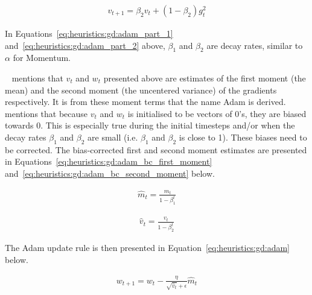 \begin{equation}
      \label{eq:heuristics:gd:adam_part_2}
      \begin{split}
            v_{t+1} = \beta_{2}v_{t} + (1 - \beta_{2})g^{2}_{t}
      \end{split}
\end{equation}

In Equations~\ref{eq:heuristics:gd:adam_part_1} and~\ref{eq:heuristics:gd:adam_part_2} above, $\beta_{1}$ and $\beta_{2}$ are decay rates, similar to $\alpha$ for \ac{Momentum}.

\citeauthor{ref:ruder:2016}~\cite{ref:ruder:2016} mentions that $v_{t}$ and $w_{t}$ presented above are estimates of the first moment (the mean) and the second moment (the uncentered variance) of the gradients respectively. It is from these moment terms that the name \acl{Adam} is derived.~\citeauthor{ref:kingma:2014}~\cite{ref:kingma:2014} mentions that because $v_{t}$ and $w_{t}$ is initialised to be vectors of 0's, they are biased towards 0. This is especially true during the initial timesteps and/or when the decay rates $\beta_{1}$ and $\beta_{2}$ are small (i.e. $\beta_{1}$ and $\beta_{2}$ is close to 1). These biases need to be corrected. The bias-corrected first and second moment estimates are presented in Equations~\ref{eq:heuristics:gd:adam_bc_first_moment} and~\ref{eq:heuristics:gd:adam_bc_second_moment} below.

\begin{equation}
      \label{eq:heuristics:gd:adam_bc_first_moment}
      \begin{split}
            \hat{m}_{t} = \frac{m_{t}}{1 - \beta^{t}_{1}}
      \end{split}
\end{equation}


\begin{equation}
      \label{eq:heuristics:gd:adam_bc_second_moment}
      \begin{split}
            \hat{v}_{t} = \frac{v_{t}}{1 - \beta^{t}_{2}}
      \end{split}
\end{equation}

The \ac{Adam} update rule is then presented in Equation~\ref{eq:heuristics:gd:adam} below.

\begin{equation}
      \label{eq:heuristics:gd:adam}
      \begin{split}
            w_{t+1} = w_{t} - \frac{\eta}{\sqrt{\hat{v}_{t}} + \epsilon}\hat{m}_{t}
      \end{split}
\end{equation}

